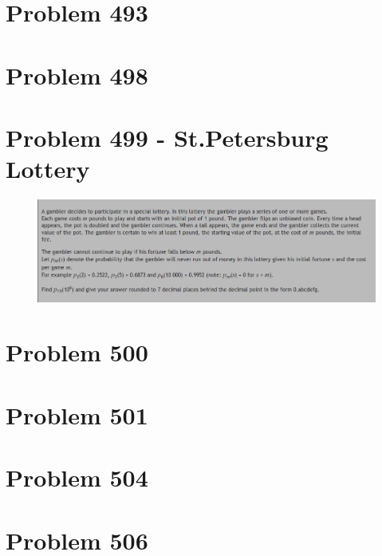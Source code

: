 \section{Problem 493}
\section{Problem 498}
\section{Problem 499 - St.Petersburg Lottery}
\begin{prob}
	\begin{figure}[htb!]
		\begin{center}
			\includegraphics[scale = 0.4]{pic/499.png}
		\end{center}
	\end{figure}
\end{prob}
\begin{sol}
	
\end{sol}
\section{Problem 500}
\section{Problem 501}
\section{Problem 504}
\section{Problem 506}